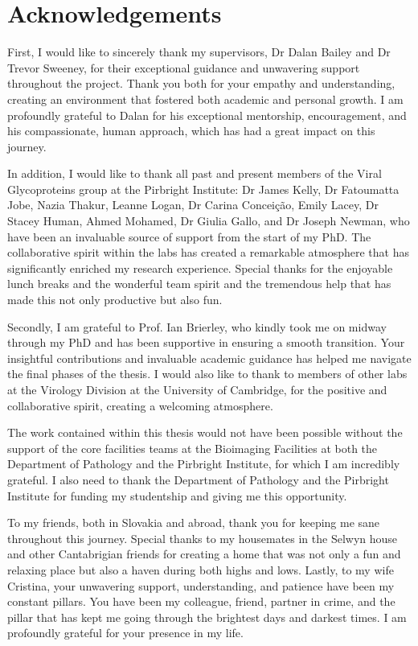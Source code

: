 \chapter{Acknowledgements}
First, I would like to sincerely thank my supervisors, Dr Dalan Bailey and Dr Trevor Sweeney, for their exceptional guidance and unwavering support throughout the project. Thank you both for your empathy and understanding, creating an environment that fostered both academic and personal growth. I am profoundly grateful to Dalan for his exceptional mentorship, encouragement, and his compassionate, human approach, which has had a great impact on this journey. 

In addition, I would like to thank all past and present members of the Viral Glycoproteins group at the Pirbright Institute: Dr James Kelly, Dr Fatoumatta Jobe, Nazia Thakur, Leanne Logan, Dr Carina Conceição, Emily Lacey, Dr Stacey Human, Ahmed Mohamed, Dr Giulia Gallo, and  Dr Joseph Newman, who have been an invaluable source of support from the start of my PhD. The collaborative spirit within the labs has created a remarkable atmosphere that has significantly enriched my research experience. Special thanks for the enjoyable lunch breaks and the wonderful team spirit and the tremendous help that has made this not only productive but also fun.

Secondly, I am grateful to Prof. Ian Brierley, who kindly took me on midway through my PhD and has been supportive in ensuring a smooth transition. Your insightful contributions and invaluable academic guidance has helped me navigate the final phases of the thesis. I would also like to thank to members of other labs at the Virology Division at the University of Cambridge, for the positive and collaborative spirit, creating a welcoming atmosphere.

The work contained within this thesis would not have been possible without the support of the core facilities teams at the Bioimaging Facilities at both the Department of Pathology and the Pirbright Institute, for which I am incredibly grateful. I also need to thank the Department of Pathology and the Pirbright Institute for funding my studentship and giving me this opportunity.

To my friends, both in Slovakia and abroad, thank you for keeping me sane throughout this journey. Special thanks to my housemates in the Selwyn house and other Cantabrigian friends for creating a home that was not only a fun and relaxing place but also a haven during both highs and lows. Lastly, to my wife Cristina, your unwavering support, understanding, and patience have been my constant pillars. You have been my colleague, friend, partner in crime, and the pillar that has kept me going through the brightest days and darkest times. I am profoundly grateful for your presence in my life.

